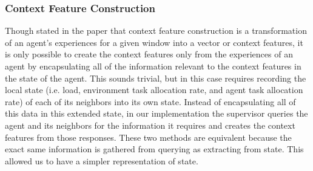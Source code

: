 \documentclass[letterpaper]{article}
\begin{document}
\subsubsection{Context Feature Construction}
Though stated in the paper that context feature construction is a transformation of an agent’s experiences for a given window into a vector or context features, it is only possible to create the context features only from the experiences of an agent by encapsulating all of the information relevant to the context features in the state of the agent. This sounds trivial, but in this case requires recording the local state (i.e. load, environment task allocation rate, and agent task allocation rate) of each of its neighbors into its own state.  Instead of encapsulating all of this data in this extended state, in our implementation the supervisor queries the agent and its neighbors for the information it requires and creates the context features from those responses.  These two methods are equivalent because the exact same information is gathered from querying as extracting from state.  This allowed us to have a simpler representation of state.
\end{document}
